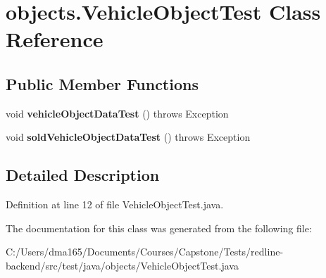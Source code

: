 \hypertarget{classobjects_1_1_vehicle_object_test}{}\section{objects.\+Vehicle\+Object\+Test Class Reference}
\label{classobjects_1_1_vehicle_object_test}
\subsection*{Public Member Functions}
\begin{DoxyCompactItemize}
\item 
\mbox{\label{classobjects_1_1_vehicle_object_test_a48828a9f14b5fee8ae57c3e8d197f8a2}} 
void {\bfseries vehicle\+Object\+Data\+Test} ()  throws Exception 
\item 
\mbox{\label{classobjects_1_1_vehicle_object_test_ace7aa3ca948e2e8a5c7e95b645b588af}} 
void {\bfseries sold\+Vehicle\+Object\+Data\+Test} ()  throws Exception 
\end{DoxyCompactItemize}


\subsection{Detailed Description}


Definition at line 12 of file Vehicle\+Object\+Test.\+java.



The documentation for this class was generated from the following file\+:\begin{DoxyCompactItemize}
\item 
C\+:/\+Users/dma165/\+Documents/\+Courses/\+Capstone/\+Tests/redline-\/backend/src/test/java/objects/Vehicle\+Object\+Test.\+java\end{DoxyCompactItemize}
